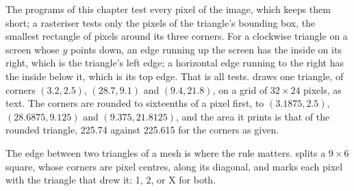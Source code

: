 \label{lst:b3:computer-graphics:raster}

The programs of this chapter test every pixel of the image, which keeps them short; a rasteriser tests only the pixels of the triangle's bounding box, the smallest rectangle of pixels around its three corners. For a clockwise triangle on a screen whose $y$ points down, an edge running up the screen has the inside on its right, which is the triangle's left edge; a horizontal edge running to the right has the inside below it, which is its top edge. That is all  tests.  draws one triangle, of corners $(3.2, 2.5)$, $(28.7, 9.1)$ and $(9.4, 21.8)$, on a grid of $32 \times 24$ pixels, as text. The corners are rounded to sixteenths of a pixel first, to $(3.1875, 2.5)$, $(28.6875, 9.125)$ and $(9.375, 21.8125)$, and the area it prints is that of the rounded triangle, 225.74 against 225.615 for the corners as given.

\label{out:b3:computer-graphics:raster}

The edge between two triangles of a mesh is where the rule matters.  splits a $9 \times 6$ square, whose corners are pixel centres, along its diagonal, and marks each pixel with the triangle that drew it: 1, 2, or X for both.

\label{out:b3:computer-graphics:shared}

